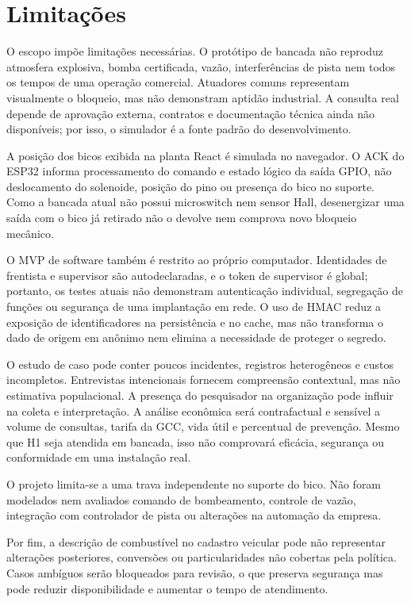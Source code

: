 \section{Limitações}
\label{sec:limitacoes}

O escopo impõe limitações necessárias. O protótipo de bancada não reproduz
atmosfera explosiva, bomba certificada, vazão, interferências de pista nem todos
os tempos de uma operação comercial. Atuadores comuns representam visualmente
o bloqueio, mas não demonstram aptidão industrial. A consulta real depende de
aprovação externa, contratos e documentação técnica ainda não disponíveis; por
isso, o simulador é a fonte padrão do desenvolvimento.

A posição dos bicos exibida na planta React é simulada no navegador. O ACK do
ESP32 informa processamento do comando e estado lógico da saída GPIO, não
deslocamento do solenoide, posição do pino ou presença do bico no suporte. Como
a bancada atual não possui microswitch nem sensor Hall, desenergizar uma saída
com o bico já retirado não o devolve nem comprova novo bloqueio mecânico.

O MVP de software também é restrito ao próprio computador. Identidades de
frentista e supervisor são autodeclaradas, e o token de supervisor é global;
portanto, os testes atuais não demonstram autenticação individual, segregação de
funções ou segurança de uma implantação em rede. O uso de HMAC reduz a exposição
de identificadores na persistência e no cache, mas não transforma o dado de
origem em anônimo nem elimina a necessidade de proteger o segredo.

O estudo de caso pode conter poucos incidentes, registros heterogêneos e custos
incompletos. Entrevistas intencionais fornecem compreensão contextual, mas não
estimativa populacional. A presença do pesquisador na organização pode influir
na coleta e interpretação. A análise econômica será contrafactual e sensível a
volume de consultas, tarifa da GCC, vida útil e percentual de prevenção. Mesmo
que H1 seja atendida em bancada, isso não comprovará eficácia, segurança ou
conformidade em uma instalação real.

O projeto limita-se a uma trava independente no suporte do bico. Não foram
modelados nem avaliados comando de bombeamento, controle de vazão, integração
com controlador de pista ou alterações na automação da empresa.

Por fim, a descrição de combustível no cadastro veicular pode não representar
alterações posteriores, conversões ou particularidades não cobertas pela
política. Casos ambíguos serão bloqueados para revisão, o que preserva segurança
mas pode reduzir disponibilidade e aumentar o tempo de atendimento.
